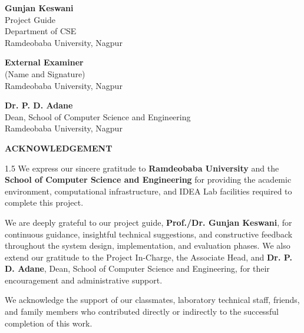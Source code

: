 \documentclass[12pt,a4paper,oneside]{report}
\begin{document}
\vspace{5.0em}

\noindent
\begin{minipage}[t]{0.48\textwidth}
\textbf{Gunjan Keswani}\\
Project Guide\\
Department of CSE\\
Ramdeobaba University, Nagpur
\end{minipage}
\hfill
\begin{minipage}[t]{0.48\textwidth}
\raggedleft
\textbf{External Examiner}\\
(Name and Signature)\\
Ramdeobaba University, Nagpur
\end{minipage}

\vspace{5.0em}
\begin{center}
\textbf{Dr. P. D. Adane}\\
Dean, School of Computer Science and Engineering\\
Ramdeobaba University, Nagpur
\end{center}

\clearpage
\begin{center}
{\fontsize{14pt}{18pt}\bfseries\selectfont ACKNOWLEDGEMENT}\\[2.0em]
\end{center}

\begin{spacing}{1.5}
We express our sincere gratitude to \textbf{Ramdeobaba University} and the \textbf{School of Computer Science and Engineering} for providing the academic environment, computational infrastructure, and IDEA Lab facilities required to complete this project.

We are deeply grateful to our project guide, \textbf{Prof./Dr. Gunjan Keswani}, for continuous guidance, insightful technical suggestions, and constructive feedback throughout the system design, implementation, and evaluation phases. We also extend our gratitude to the Project In-Charge, the Associate Head, and \textbf{Dr. P. D. Adane}, Dean, School of Computer Science and Engineering, for their encouragement and administrative support.

We acknowledge the support of our classmates, laboratory technical staff, friends, and family members who contributed directly or indirectly to the successful completion of this work.
\end{spacing}
\end{document}
